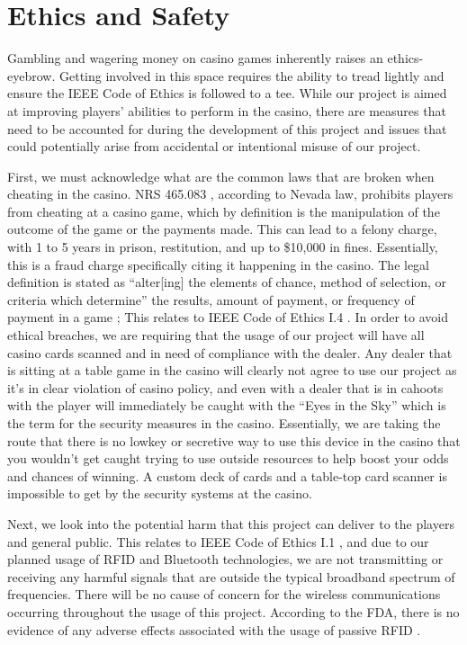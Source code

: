 \documentclass[12pt]{article}
\begin{document}
\section{Ethics and Safety}

Gambling and wagering money on casino games inherently raises an ethics-eyebrow. Getting involved in this space requires the ability to tread lightly and ensure the IEEE Code of Ethics \cite{IEEE_ethics} is followed to a tee. While our project is aimed at improving players' abilities to perform in the casino, there are measures that need to be accounted for during the development of this project and issues that could potentially arise from accidental or intentional misuse of our project. 

First, we must acknowledge what are the common laws that are broken when cheating in the casino. NRS 465.083 \cite{NRS}, according to Nevada law, prohibits players from cheating at a casino game, which by definition is the manipulation of the outcome of the game or the payments made. This can lead to a felony charge, with 1 to 5 years in prison, restitution, and up to \$10,000 in fines. Essentially, this is a fraud charge specifically citing it happening in the casino. The legal definition is stated as ``alter[ing] the elements of chance, method of selection, or criteria which determine'' the results, amount of payment, or frequency of payment in a game \cite{NRS}; This relates to IEEE Code of Ethics I.4 \cite{IEEE_ethics}. In order to avoid ethical breaches, we are requiring that the usage of our project will have all casino cards scanned and in need of compliance with the dealer. Any dealer that is sitting at a table game in the casino will clearly not agree to use our project as it's in clear violation of casino policy, and even with a dealer that is in cahoots with the player will immediately be caught with the ``Eyes in the Sky'' which is the term for the security measures in the casino. Essentially, we are taking the route that there is no lowkey or secretive way to use this device in the casino that you wouldn't get caught trying to use outside resources to help boost your odds and chances of winning. A custom deck of cards and a table-top card scanner is impossible to get by the security systems at the casino. 

Next, we look into the potential harm that this project can deliver to the players and general public. This relates to IEEE Code of Ethics I.1 \cite{IEEE_ethics}, and due to our planned usage of RFID and Bluetooth technologies, we are not transmitting or receiving any harmful signals that are outside the typical broadband spectrum of frequencies. There will be no cause of concern for the wireless communications occurring throughout the usage of this project. According to the FDA, there is no evidence of any adverse effects associated with the usage of passive RFID \cite{FDA_RFID}.
\end{document}
